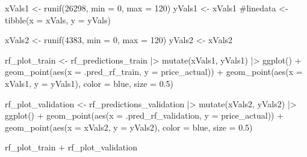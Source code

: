 \documentclass[
]{article}
\newenvironment{Shaded}{\begin{snugshade}}{\end{snugshade}}
\newcommand{\AttributeTok}[1]{\textcolor[rgb]{0.40,0.45,0.13}{#1}}
\newcommand{\CommentTok}[1]{\textcolor[rgb]{0.37,0.37,0.37}{#1}}
\newcommand{\DecValTok}[1]{\textcolor[rgb]{0.68,0.00,0.00}{#1}}
\newcommand{\FloatTok}[1]{\textcolor[rgb]{0.68,0.00,0.00}{#1}}
\newcommand{\FunctionTok}[1]{\textcolor[rgb]{0.28,0.35,0.67}{#1}}
\newcommand{\NormalTok}[1]{\textcolor[rgb]{0.00,0.23,0.31}{#1}}
\newcommand{\OtherTok}[1]{\textcolor[rgb]{0.00,0.23,0.31}{#1}}
\newcommand{\SpecialCharTok}[1]{\textcolor[rgb]{0.37,0.37,0.37}{#1}}
\newcommand{\StringTok}[1]{\textcolor[rgb]{0.13,0.47,0.30}{#1}}
\begin{document}
\begin{Shaded}
\begin{Highlighting}[]
\NormalTok{xVals1 }\OtherTok{\textless{}{-}} \FunctionTok{runif}\NormalTok{(}\DecValTok{26298}\NormalTok{, }\AttributeTok{min =} \DecValTok{0}\NormalTok{, }\AttributeTok{max =} \DecValTok{120}\NormalTok{)}
\NormalTok{yVals1 }\OtherTok{\textless{}{-}}\NormalTok{ xVals1}
\CommentTok{\#linedata \textless{}{-} tibble(x = xVals, y = yVals)}

\NormalTok{xVals2 }\OtherTok{\textless{}{-}} \FunctionTok{runif}\NormalTok{(}\DecValTok{4383}\NormalTok{, }\AttributeTok{min =} \DecValTok{0}\NormalTok{, }\AttributeTok{max =} \DecValTok{120}\NormalTok{)}
\NormalTok{yVals2 }\OtherTok{\textless{}{-}}\NormalTok{ xVals2}

\NormalTok{rf\_plot\_train }\OtherTok{\textless{}{-}}\NormalTok{ rf\_predictions\_train }\SpecialCharTok{|\textgreater{}}
  \FunctionTok{mutate}\NormalTok{(xVals1, yVals1) }\SpecialCharTok{|\textgreater{}}
  \FunctionTok{ggplot}\NormalTok{() }\SpecialCharTok{+}
  \FunctionTok{geom\_point}\NormalTok{(}\FunctionTok{aes}\NormalTok{(}\AttributeTok{x =}\NormalTok{ .pred\_rf\_train, }\AttributeTok{y =}\NormalTok{ price\_actual)) }\SpecialCharTok{+}
  \FunctionTok{geom\_point}\NormalTok{(}\FunctionTok{aes}\NormalTok{(}\AttributeTok{x =}\NormalTok{ xVals1, }\AttributeTok{y =}\NormalTok{ yVals1), }\AttributeTok{color =} \StringTok{\textquotesingle{}blue\textquotesingle{}}\NormalTok{, }\AttributeTok{size =} \FloatTok{0.5}\NormalTok{)}

\NormalTok{rf\_plot\_validation }\OtherTok{\textless{}{-}}\NormalTok{ rf\_predictions\_validation }\SpecialCharTok{|\textgreater{}}
  \FunctionTok{mutate}\NormalTok{(xVals2, yVals2) }\SpecialCharTok{|\textgreater{}}
  \FunctionTok{ggplot}\NormalTok{() }\SpecialCharTok{+}
  \FunctionTok{geom\_point}\NormalTok{(}\FunctionTok{aes}\NormalTok{(}\AttributeTok{x =}\NormalTok{ .pred\_rf\_validation, }\AttributeTok{y =}\NormalTok{ price\_actual)) }\SpecialCharTok{+}
  \FunctionTok{geom\_point}\NormalTok{(}\FunctionTok{aes}\NormalTok{(}\AttributeTok{x =}\NormalTok{ xVals2, }\AttributeTok{y =}\NormalTok{ yVals2), }\AttributeTok{color =} \StringTok{\textquotesingle{}blue\textquotesingle{}}\NormalTok{, }\AttributeTok{size =} \FloatTok{0.5}\NormalTok{)}

\NormalTok{rf\_plot\_train }\SpecialCharTok{+}\NormalTok{ rf\_plot\_validation}
\end{Highlighting}
\end{Shaded}
\end{document}
